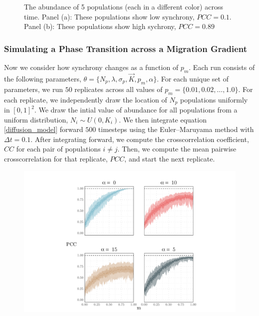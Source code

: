 \documentclass[]{article}
\begin{document}
\begin{figure}[h]
\caption{The abundance of 5 populations (each in a different color) across time. Panel (a):  These populations show low synchrony, $PCC=0.1$. Panel (b): These populations show high sychrony, $PCC=0.89$ }

\label{async_and_sync}

\end{figure}

\hypertarget{simulating-a-phase-transition-across-a-migration-gradient}{%
\subsubsection{Simulating a Phase Transition across a Migration
Gradient}\label{simulating-a-phase-transition-across-a-migration-gradient}}

Now we consider how synchrony changes as a function of \(p_m\). Each run
consists of the following parameters,
\(\theta = \{N_p, \lambda, \sigma_p, \vec{K},p_m, \alpha \}\). For each
unique set of parameters, we run \(50\) replicates across all values of
\(p_m = \{0.01,0.02,\dots,1.0 \}\). For each replicate, we independently
draw the location of \(N_p\) populations uniformly in \([0,1]^2\). We
draw the intial value of abundance for all populations from a uniform
distribution, \(N_i \sim U(0, K_i)\). We then integrate equation
\ref{diffusion_model} forward \(500\) timesteps using the
Euler--Maruyama method with \(\Delta t=0.1\). After integrating forward,
we compute the crosscorrelation coefficient, \(CC\) for each pair of
populations \(i \neq j\). Then, we compute the mean pairwise
crosscorrelation for that replicate, \(PCC\), and start the next
replicate.

\pagebreak

\begin{figure}
    \includegraphics[width=15cm]{figs/figure4.pdf}
    \caption{}
    \label{}
\end{figure}



\clearpage
{
\footnotesize

}
\end{document}
